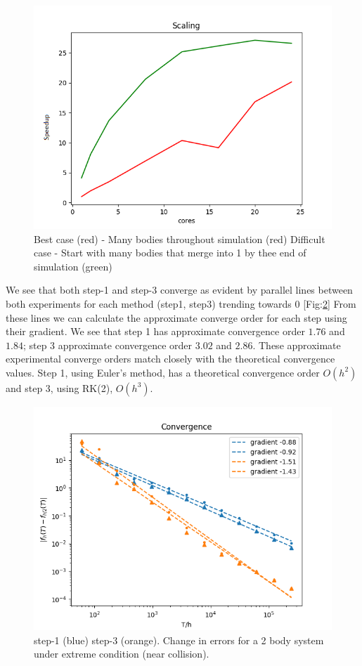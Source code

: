 \documentclass{article}
\begin{document}
\begin{figure}[h!]
  \includegraphics[scale=1]{scaling.png}
  \caption{Best case (red) - Many bodies throughout simulation (red) Difficult case - Start with many bodies that merge into 1 by thee end of simulation (green)}
  \label{fig:scaling}
\end{figure}

We see that both step-1 and step-3 converge as evident by parallel lines between both experiments for each method (step1, step3) trending towards 0 [Fig:\ref{fig:convergence}] From these lines we can calculate the approximate converge order for each step using their gradient. We see that step 1 has approximate convergence order $1.76$ and $1.84$; step 3 approximate convergence order $3.02$ and $2.86$. These approximate experimental converge orders match closely with the theoretical convergence values. Step 1, using Euler's method, has a theoretical convergence order $O(h^2)$ and step 3, using RK(2), $O(h^3)$. 


\begin{figure}[h!]
  \begin{center}
  \includegraphics[scale=0.75]{convergence.png}
    \caption{step-1 (blue) step-3 (orange). Change in errors for a 2 body system under extreme condition (near collision).}
    \label{fig:convergence}
  \end{center}
  \end{figure}


 
\end{document}
